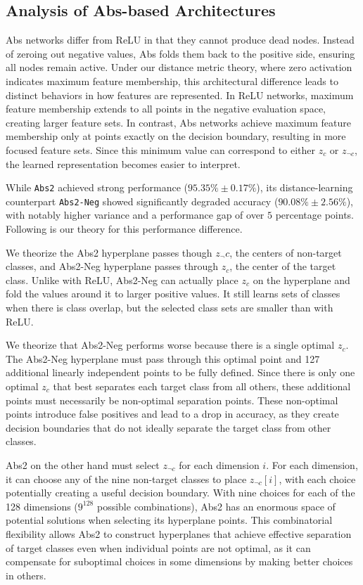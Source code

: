 \subsection{Analysis of Abs-based Architectures}

Abs networks differ from ReLU in that they cannot produce dead nodes. Instead of zeroing out negative values, Abs folds them back to the positive side, ensuring all nodes remain active. Under our distance metric theory, where zero activation indicates maximum feature membership, this architectural difference leads to distinct behaviors in how features are represented. In ReLU networks, maximum feature membership extends to all points in the negative evaluation space, creating larger feature sets. In contrast, Abs networks achieve maximum feature membership only at points exactly on the decision boundary, resulting in more focused feature sets. Since this minimum value can correspond to either $z_c$ or $z_{\neg c}$, the learned representation becomes easier to interpret.

While \texttt{Abs2} achieved strong performance ($95.35\% \pm 0.17\%$), its distance-learning counterpart \texttt{Abs2-Neg} showed significantly degraded accuracy ($90.08\% \pm 2.56\%$), with notably higher variance and a performance gap of over $5$ percentage points. Following is our theory for this performance difference.

We theorize the Abs2 hyperplane passes though $z_\neg c$, the centers of non-target classes, and Abs2-Neg hyperplane passes through $z_c$, the center of the target class. Unlike with ReLU, Abs2-Neg can actually place $z_c$ on the hyperplane and fold the values around it to larger positive values. It still learns sets of classes when there is class overlap, but the selected class sets are smaller than with ReLU.

We theorize that Abs2-Neg performs worse because there is a single optimal $z_c$. The Abs2-Neg hyperplane must pass through this optimal point and 127 additional linearly independent points to be fully defined. Since there is only one optimal $z_c$ that best separates each target class from all others, these additional points must necessarily be non-optimal separation points. These non-optimal points introduce false positives and lead to a drop in accuracy, as they create decision boundaries that do not ideally separate the target class from other classes.

Abs2 on the other hand must select $z_{\neg c}$ for each dimension $i$. For each dimension, it can choose any of the nine non-target classes to place $z_{\neg c}[i]$, with each choice potentially creating a useful decision boundary. With nine choices for each of the 128 dimensions ($9^{128}$ possible combinations), Abs2 has an enormous space of potential solutions when selecting its hyperplane points. This combinatorial flexibility allows Abs2 to construct hyperplanes that achieve effective separation of target classes even when individual points are not optimal, as it can compensate for suboptimal choices in some dimensions by making better choices in others.

